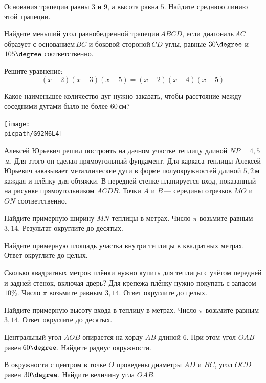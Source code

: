 \begin{homework}[number=2]
\begin{listofex}
		\item Основания трапеции равны \( 3 \) и \( 9 \), а высота равна \( 5 \). Найдите среднюю линию этой трапеции.
		\item Найдите меньший угол равнобедренной трапеции \( ABCD \), если диагональ \( AC \) образует с основанием \( BC \) и боковой стороной \( CD \) углы, равные \( 30\degree \) и \( 105\degree \) соответственно.
		\item Решите уравнение:
		\[(x-2)(x-3)(x-5)=(x-2)(x-4)(x-5)\]
	\end{listofex}
\end{homework}

\begin{class}[number=5]
	\begin{listofex}
		\item Какое наименьшее количество дуг нужно заказать, чтобы расстояние между соседними дугами было не более \( 60 \) см?
		\begin{center}
			\texttt{[image: \\picpath/G92M6L4]}
		\end{center}
		Алексей Юрьевич решил построить на дачном участке теплицу длиной \( NP=4,5 \) м. Для этого он сделал прямоугольный фундамент. Для каркаса теплицы Алексей Юрьевич заказывает металлические дуги в форме полуокружностей длиной \( 5,2 \) м каждая и плёнку для обтяжки. В передней стенке планируется вход, показанный на рисунке прямоугольником \( ACDB \). Точки \( A \) и \( B \) --- середины отрезков \( MO \) и \( ON \) соответственно.
		\item Найдите примерную ширину \( MN \) теплицы в метрах. Число \( \pi  \) возьмите равным \( 3,14 \). Результат округлите до десятых.
		\item Найдите примерную площадь участка внутри теплицы в квадратных метрах. Ответ округлите до целых.
		\item Сколько квадратных метров плёнки нужно купить для теплицы с учётом передней и задней стенок, включая дверь? Для крепежа плёнку нужно покупать с запасом \( 10\% \). Число \( \pi \) возьмите равным \( 3,14 \). Ответ округлите до целых.
		\item Найдите примерную высоту входа в теплицу в метрах. Число \( \pi \) возьмите равным \( 3,14 \). Ответ округлите до десятых.
		\item Центральный угол \( AOB \) опирается на хорду \( AB \) длиной \( 6 \). При этом угол \( OAB \) равен \( 60\degree \). Найдите радиус окружности.
		\item В окружности с центром в точке \( O \) проведены диаметры \( AD \) и \( BC \), угол \( OCD \) равен \( 30\degree \). Найдите величину угла \( OAB \).

\end{listofex}
\end{class}
